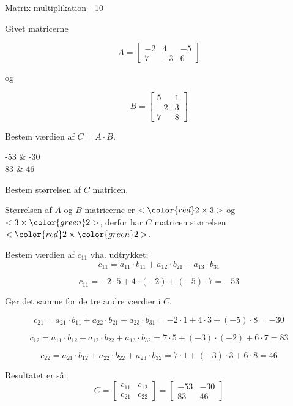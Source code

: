 \documentclass{article}
\begin{document}
\newpage

\begin{exercise}{Matrix multiplikation - 10}
	
	Givet matricerne 
	
	\[
	A = \left[\begin{array}{rrr}
	-2 & 4 & -5 \\ 
	7 & -3 & 6
	\end{array} \right]
	\]
	
	og 
	
	\[
	B = \left[\begin{array}{rr}
	5 & 1 \\ 
	-2 & 3 \\
	7 & 8 
	\end{array} \right]
	\]
	
	Bestem værdien af $C = A \cdot B$.
	
	\begin{answermatrix}
		-53 & -30  \\
		83 & 46 
	\end{answermatrix}
	
	\hint
	Bestem størrelsen af $C$ matricen.
	
	\hint
	Størrelsen af $A$ og $B$ matricerne er $<{\color{red} 2} \times 3>$ og $<3 \times {\color{green}2}>$, 
	derfor har $C$ matricen størrelsen $<{\color{red} 2} \times {\color{green}2}>$.
	
	\hint
	Bestem værdien af $c_{11}$ vha. udtrykket:
	\[
	c_{11} = a_{11} \cdot b_{11} + a_{12} \cdot b_{21} + a_{13} \cdot b_{31}
	\]
	
	\hint
	\[
	c_{11} = -2 \cdot 5 + 4 \cdot (-2) + (-5) \cdot 7 = -53
	\]
	
	\hint
	Gør det samme for de tre andre værdier i $C$.
	
	\hint
	\[
		c_{21} = a_{21} \cdot b_{11} + a_{22} \cdot b_{21} + a_{23} \cdot b_{31}   = -2 \cdot 1 + 4 \cdot 3 + (-5) \cdot 8 = -30
	\]
	
	\hint
	\[
		c_{12} = a_{11} \cdot b_{12} + a_{12} \cdot b_{22} + a_{13} \cdot b_{32}  = 7 \cdot 5 + (-3) \cdot (-2) + 6 \cdot 7 = 83
	\]
	
	\hint
	\[
		c_{22} = a_{21} \cdot b_{12} + a_{22} \cdot b_{22} + a_{23} \cdot b_{32} = 7 \cdot 1 + (-3) \cdot 3 + 6 \cdot 8 = 46
	\]
	
	
	\hint
	Resultatet er så:
	\[
	C = \left[\begin{array}{rr}
	c_{11} & c_{12} \\
	c_{21} & c_{22} 
	\end{array} \right] = 
	\left[\begin{array}{rr}
	-53 & -30 \\
	83 & 46 
	\end{array} \right]
	\]
	
	
\end{exercise}


\newpage


\end{document}
